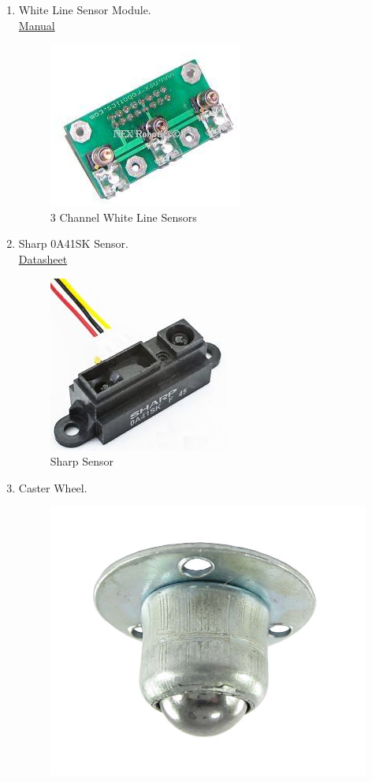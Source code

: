 \documentclass[a4paper,12pt,oneside]{book}
\begin{document}
\begin{enumerate}
    \item White Line Sensor Module.\\
    \href{http://www.nex-robotics.com/images/downloads/3\%20channel\%20line\%20sensor.pdf}{ Manual}\par
   \begin{figure}[!ht]
        \centering
        \includegraphics[scale=0.85]{whiteline}
        \caption{3 Channel White Line Sensors}
      \end{figure}
    \item Sharp 0A41SK Sensor.\\
    \href{http://www.sharp-world.com/products/device/lineup/data/pdf/datasheet/gp2y0a41sk_e.pdf}{ Datasheet}\par
   \begin{figure}[!ht]
        \centering
        \includegraphics[scale=0.7]{sharp}
        \caption{Sharp Sensor}
      \end{figure}
    \item Caster Wheel.
    \begin{figure}[!ht]
        \centering
        \includegraphics[scale=0.15]{caster}

\end{figure}
\end{enumerate}
\end{document}
